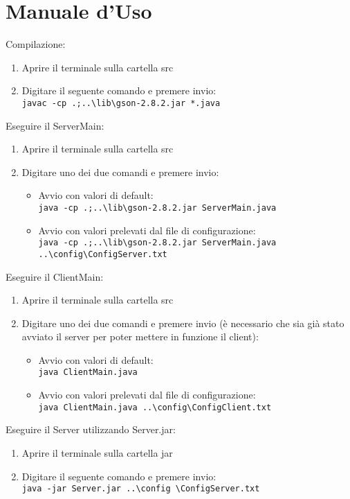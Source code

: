 \documentclass[11pt, a4paper, oneside]{article}
\begin{document}
\section{Manuale d'Uso}
Compilazione:
\begin{enumerate}
    \item Aprire il terminale sulla cartella src
    \item Digitare il seguente comando e premere invio:\\ \texttt{javac -cp .;..\textbackslash lib\textbackslash gson-2.8.2.jar *.java}
\end{enumerate}
Eseguire il ServerMain:
\begin{enumerate}
    \item Aprire il terminale sulla cartella src
    \item Digitare uno dei due comandi e premere invio:
    \begin{itemize}
        \item Avvio con valori di default:\\ \texttt{java -cp .;..\textbackslash lib\textbackslash gson-2.8.2.jar ServerMain.java}
        \item Avvio con valori prelevati dal file di configurazione:\\ \texttt{java -cp .;..\textbackslash lib\textbackslash gson-2.8.2.jar ServerMain.java ..\textbackslash config\textbackslash ConfigServer.txt}
    \end{itemize}
\end{enumerate}
Eseguire il ClientMain:
\begin{enumerate}
    \item Aprire il terminale sulla cartella src
    \item Digitare uno dei due comandi e premere invio (è necessario che sia già stato avviato il server per poter mettere in funzione il client):
    \begin{itemize}
        \item Avvio con valori di default:\\ \texttt{java ClientMain.java}
        \item Avvio con valori prelevati dal file di configurazione:\\ \texttt{java ClientMain.java ..\textbackslash config\textbackslash ConfigClient.txt}
    \end{itemize}
\end{enumerate}
Eseguire il Server utilizzando Server.jar:
\begin{enumerate}
    \item Aprire il terminale sulla cartella jar
    \item Digitare il seguente comando e premere invio:\\
    \texttt{java -jar Server.jar ..\textbackslash config \textbackslash ConfigServer.txt}
\end{enumerate}
\end{document}

